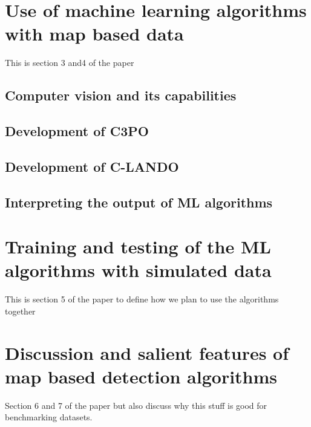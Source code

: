 \chapter{Use of machine learning algorithms with map based data}
This is section 3 and4 of the paper
\section{Computer vision and its capabilities}
\section{Development of C3PO}
\section{Development of C-LANDO}
\section{Interpreting the output of ML algorithms}

\chapter{Training and testing of the ML algorithms with simulated data}
This is section 5 of the paper to define how we plan to use the algorithms together


\chapter{Discussion and salient features of map based detection algorithms}
Section 6 and 7 of the paper but also discuss why this stuff is good for benchmarking datasets.
